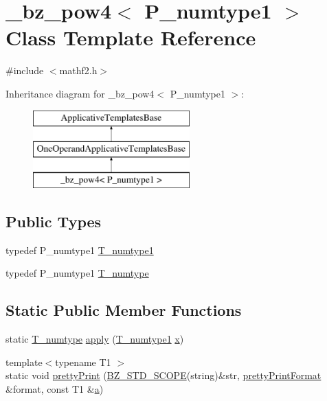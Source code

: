 \hypertarget{class__bz__pow4}{}\section{\+\_\+bz\+\_\+pow4$<$ P\+\_\+numtype1 $>$ Class Template Reference}
\label{class__bz__pow4}


{\ttfamily \#include $<$mathf2.\+h$>$}

Inheritance diagram for \+\_\+bz\+\_\+pow4$<$ P\+\_\+numtype1 $>$\+:\begin{figure}[H]
\begin{center}
\leavevmode
\includegraphics[height=3.000000cm]{class__bz__pow4}
\end{center}
\end{figure}
\subsection*{Public Types}
\begin{DoxyCompactItemize}
\item 
typedef P\+\_\+numtype1 \hyperlink{class__bz__pow4_ab2f5759866642c715925a1489cc727ac}{T\+\_\+numtype1}
\item 
typedef P\+\_\+numtype1 \hyperlink{class__bz__pow4_a442a78bc8f42ff36de8b71dbe8f53ec7}{T\+\_\+numtype}
\end{DoxyCompactItemize}
\subsection*{Static Public Member Functions}
\begin{DoxyCompactItemize}
\item 
static \hyperlink{class__bz__pow4_a442a78bc8f42ff36de8b71dbe8f53ec7}{T\+\_\+numtype} \hyperlink{class__bz__pow4_ad2f80071d7745ce5d441f169d56cbfcf}{apply} (\hyperlink{class__bz__pow4_ab2f5759866642c715925a1489cc727ac}{T\+\_\+numtype1} \hyperlink{vecnorm1_8cc_ac73eed9e41ec09d58f112f06c2d6cb63}{x})
\item 
{\footnotesize template$<$typename T1 $>$ }\\static void \hyperlink{class__bz__pow4_a15937e12b5c6343c82ef073d1e9333d9}{pretty\+Print} (\hyperlink{numinquire_8h_a2b24ffc3b4ef9803956bc7715c6c7b83}{B\+Z\+\_\+\+S\+T\+D\+\_\+\+S\+C\+O\+P\+E}(string)\&str, \hyperlink{classprettyPrintFormat}{pretty\+Print\+Format} \&format, const T1 \&\hyperlink{gen__mat5files_8m_aae328bf20413f220e38aec4d95bfd6da}{a})
\end{DoxyCompactItemize}



